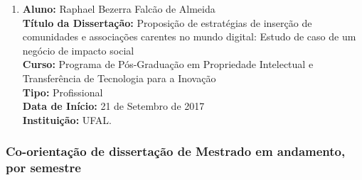 \documentclass[a4paper,oneside,10pt]{article}
\begin{document}
\begin{enumerate}
\item   \textbf{Aluno:} Raphael Bezerra Falcão de Almeida \mbox{} \\
            \textbf{Título da Dissertação:} Proposição de estratégias de inserção de comunidades e associações carentes no mundo digital: Estudo de caso de um negócio de impacto social \\
            \textbf{Curso:} Programa de Pós-Graduação em Propriedade Intelectual e Transferência de Tecnologia para a Inovação \\%
            \textbf{Tipo:} Profissional \\%
            \textbf{Data de Início:} 21 de Setembro de 2017\\
            \textbf{Instituição:} UFAL.  
            
\end{enumerate}


\newpage
\subsubsection{Co-orientação de dissertação de Mestrado em andamento, por semestre}
\vspace{0.3cm}
\end{document}
